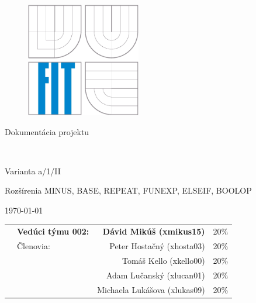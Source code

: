 \begin{titlepage}

\begin{figure}[!h]
  \centering
  \includegraphics[height=5cm]{img/logo.eps}
\end{figure}

\vfill

\begin{center}
\begin{Large}
Dokumentácia projektu\\
\end{Large}

\bigskip

	\begin{Huge}
		\projname\\
	\end{Huge}

	\begin{large}
		Varianta a/1/II\\
		{\small Rozšírenia MINUS, BASE, REPEAT, FUNEXP, ELSEIF, BOOLOP \par}
	\end{large}
\end{center}

\vfill

\begin{center}
\begin{Large}
\today
\end{Large}
\end{center}

\vfill

\begin{flushleft}

	\begin{large}
		\begin{tabularx}{\linewidth}{Xlrl}
		   & \textbf{Vedúci týmu 002:} & \textbf{Dávid Mikúš (xmikus15)} & 20\% \\
		   & Členovia: & Peter Hostačný (xhosta03) & 20\% \\
		   &           & Tomáš Kello (xkello00) & 20\% \\
		   &           & Adam Lučanský (xlucan01) & 20\% \\
		   &           & Michaela Lukášova (xlukas09) & 20\%
		\end{tabularx}
	\end{large}
\end{flushleft}
\end{titlepage}
